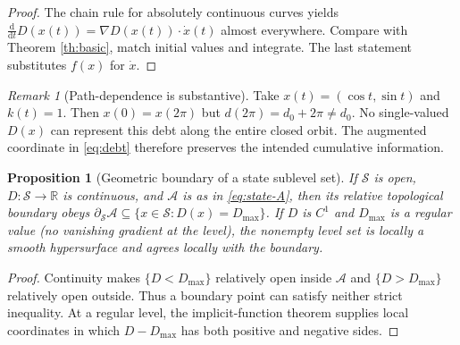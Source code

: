 \documentclass[11pt,letterpaper]{article}
\newtheorem{proposition}[theorem]{Proposition}
\theoremstyle{definition}\newtheorem{definition}[theorem]{Definition}\newtheorem{example}[theorem]{Example}
\theoremstyle{remark}\newtheorem{remark}[theorem]{Remark}
\newcommand{\R}{\mathbb R}\newcommand{\dd}{\mathrm d}\newcommand{\ess}{\operatorname{ess}}
\begin{document}
\begin{proof}
The chain rule for absolutely continuous curves yields $\frac{\dd}{\dd t}D(x(t))=\nabla D(x(t))\cdot\dot x(t)$ almost everywhere. Compare with Theorem \ref{th:basic}, match initial values and integrate. The last statement substitutes $f(x)$ for $\dot x$.
\end{proof}
\begin{remark}[Path-dependence is substantive]
Take $x(t)=(\cos t,\sin t)$ and $k(t)=1$. Then $x(0)=x(2\pi)$ but $d(2\pi)=d_0+2\pi\ne d_0$. No single-valued $D(x)$ can represent this debt along the entire closed orbit. The augmented coordinate in \eqref{eq:debt} therefore preserves the intended cumulative information.
\end{remark}
\begin{proposition}[Geometric boundary of a state sublevel set]\label{prop:boundary}
If $\mathcal S$ is open, $D:\mathcal S\to\R$ is continuous, and $\mathcal A$ is as in \eqref{eq:state-A}, then its \emph{relative} topological boundary obeys
$\partial_{\mathcal S}\mathcal A\subseteq\{x\in\mathcal S:D(x)=D_{\max}\}$.
If $D$ is $C^1$ and $D_{\max}$ is a regular value (no vanishing gradient at the level), the nonempty level set is locally a smooth hypersurface and agrees locally with the boundary.
\end{proposition}
\begin{proof}
Continuity makes $\{D<D_{\max}\}$ relatively open inside $\mathcal A$ and $\{D>D_{\max}\}$ relatively open outside. Thus a boundary point can satisfy neither strict inequality. At a regular level, the implicit-function theorem supplies local coordinates in which $D-D_{\max}$ has both positive and negative sides.
\end{proof}
\end{document}
